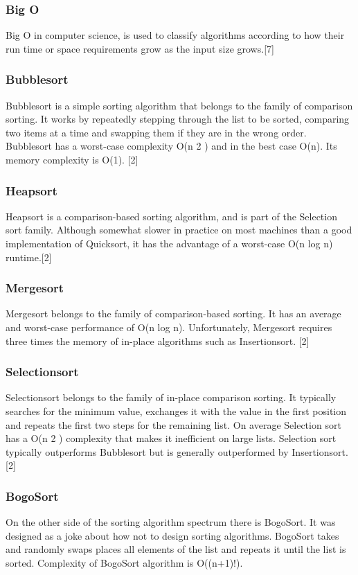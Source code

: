 \documentclass[]{report}
\begin{document}
		\subsubsection{Big O}
		Big O in computer science, is used to classify algorithms according to how their run time or space requirements grow as the input size grows.[7]
		\subsubsection{Bubblesort}
		Bubblesort is a simple sorting algorithm that belongs to the family of comparison sorting. It works by repeatedly stepping through the list to be sorted, comparing two items at a time and swapping them if they are in the wrong order. Bubblesort has a worst-case complexity O(n 2 ) and in the best case O(n). Its memory complexity is O(1). [2]
		\subsubsection{Heapsort}
		Heapsort is a comparison-based sorting algorithm, and is part of the Selection sort family. Although somewhat slower in practice on most machines than a good implementation of Quicksort, it has the advantage of a worst-case O(n log n) runtime.[2]
		\subsubsection{Mergesort}
		Mergesort belongs to the family of comparison-based sorting. It has an average and worst-case performance of O(n log n). Unfortunately, Mergesort requires three times the memory of in-place algorithms such as Insertionsort. [2]
		\subsubsection{Selectionsort}
		Selectionsort belongs to the family of in-place comparison sorting. It typically searches for the minimum value, exchanges it with the value in the first position and repeats the first two steps for the remaining list. On average Selection sort has a O(n 2 ) complexity that makes it inefficient on large lists. Selection sort typically outperforms Bubblesort but is generally outperformed by Insertionsort.[2]
		\subsubsection{BogoSort}
		On the other side of the sorting algorithm spectrum there is BogoSort. It was designed as a joke about how not to design sorting algorithms. BogoSort takes and randomly swaps places all elements of the list and repeats it until the list is sorted. Complexity of BogoSort algorithm is O((n+1)!).
\end{document}
